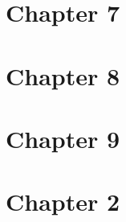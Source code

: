 \documentclass{article}
\begin{document}
    \section{Chapter 7}


    \section{Chapter 8}
    \section{Chapter 9}
    \section{Chapter 2}
\end{document}
